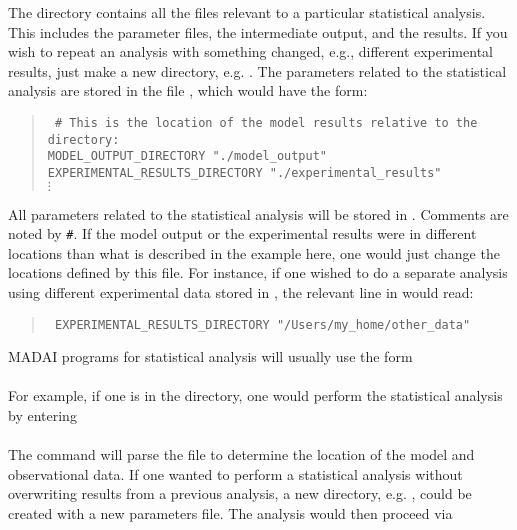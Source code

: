 The  directory contains all the files relevant to a particular statistical analysis. This includes the parameter files, the intermediate output, and the results. If you wish to repeat an analysis with something changed, e.g., different experimental results, just make a new directory, e.g. . The parameters related to the statistical analysis are stored in the file , which would have the form:
\vspace*{-8pt}\begin{quote}{\tt
	\# This is the location of the model results relative to the  directory:\\
	MODEL\_OUTPUT\_DIRECTORY "./model\_output"\\
	EXPERIMENTAL\_RESULTS\_DIRECTORY "./experimental\_results"\\
	$\vdots$\\
	}
\end{quote}\vspace*{-8pt}
All parameters related to the statistical analysis will be stored in . Comments are noted by {\tt\#}. If the model output or the experimental results were in different locations than what is described in the example here, one would just change the locations defined by this file. For instance, if one wished to do a separate analysis using different experimental data stored in , the relevant line in  would read:
\begin{quote}{\tt
EXPERIMENTAL\_RESULTS\_DIRECTORY "/Users/my\_home/other\_data"}
\end{quote}
MADAI programs for statistical analysis will usually use the form\\
\\
For example, if one is in the  directory, one would perform the statistical analysis by entering\\
\\
The command will parse the file  to determine the location of the model and observational data. If one wanted to perform a statistical analysis without overwriting results from a previous analysis, a new directory, e.g. , could be created with a new parameters file. The analysis would then proceed via\\

